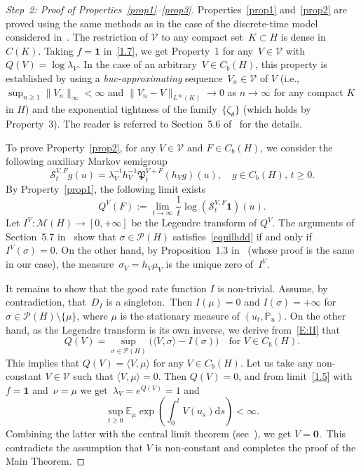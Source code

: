 \documentclass[AHL,Unicode,longabstracts]{cedram}
\newcommand{\mek}{{\mathbf 1}}
\newcommand{\IP}{{\mathbb P}}
\newcommand{\E}{{\mathbb E}}
\newcommand{\MM}{{\mathcal M}}
\newcommand{\PP}{{\mathcal P}}
\newcommand{\VV}{{\mathcal V}}
\newcommand{\la}{\lambda}
\newcommand{\ty}{\infty}
\newcommand{\PPPP}{{\mathfrak P}}
\newcommand{\SSS}{{\mathscr S}}
\newcommand{\lag}{\langle}
\newcommand{\rag}{\rangle}
\newcommand{\dd}{\mathrm{d}}
\begin{document}
\begin{proofc}
\begin{proof}[Step~2: Proof of Properties~\eqref{prop1}--\eqref{prop3}]
Properties~\eqref{prop1} and~\eqref{prop2} are proved using the same methods as in the case of the discrete-time model considered in~\cite{JNPS-2014}. The restriction of $\VV$ to any compact set~$K\subset H$ is dense in $C(K)$. Taking $f=\mek $ in~\eqref{1.7}, we get Property~1 for any~$V\in \VV$ with~$Q(V)=\log \la_V$. In the case of an arbitrary~$V\in C_b(H)$, this property is established by using a \emph{buc-approximating} sequence~$V_n\in\VV$ of $V$ (i.e.,~$\sup_{n\ge1}\|V_n\|_\ty \!< \!\ty$ and $\|V_n-V\|_{L^\ty(K)}\to 0$ as $ n\to\ty$ for any compact $K$ in $ H$) and the exponential tightness of the family~$\{\zeta_\theta\}$ (which holds by Property~3). The reader is referred to Section~5.6 of~\cite{JNPS-2014} for the details.

To prove Property~\eqref{prop2}, for any $V\in \VV$ and $F\in C_b(H)$, we consider the following auxiliary Markov semigroup
\[
\SSS_t^{V,F}g (u)=\lambda_V^{-t}h_V^{-1}\PPPP_t^{V+F}(h_V g)(u), \quad g\in C_b(H), \, t\ge0.
\]
By Property~\eqref{prop1}, the following limit exists
\[
Q^V(F):=\lim_{t\to\ty} \frac{1}{t}\log(\SSS_t^{V,F}{\mek})(u).
\]
Let $I^V: \MM(H)\to [0,+\infty] $ be the Legendre transform of $Q^V$.
The arguments of Section~5.7 in~\cite{JNPS-2014} show that $\sigma\in \PP(H)$ satisfies~\eqref{equilhdd} if and only if $I^V(\sigma)=0$. On the other hand, by Proposition~1.3 in~\cite{MN-2015} (whose proof is the same in our case), the measure~$\sigma_V=h_V\mu_V$ is the unique zero of~$I^V$.


It remains to show that the good rate function $I$ is non-trivial. Assume, by contradiction, that~$D_I$ is a singleton.~Then $I(\mu)=0$ and $I(\sigma)=+\ty$ for $\sigma\in\PP(H)\setminus\{\mu\}$, where $\mu$ is the stationary measure of $(u_t,\IP_u)$. On the other hand, as the Legendre transform is its own inverse, we derive from~\eqref{E:II} that
\[
Q(V)= \sup_{\sigma\in\PP(H)} \bigl(\lag V, \sigma\rag-I(\sigma)\bigr) \quad \text{for $V\in C_b(H)$}.
\]
This implies that $Q(V)=\lag V,\mu\rag$ for any $V\in C_b(H)$. Let us take any non-constant $V\in \VV$ such that $\lag V,\mu\rag=0$. Then $Q(V)=0$, and from limit~\eqref{1.5} with $f={\mathbf1}$ and~$\nu=\mu$ we get~$\la_V=e^{Q(V)}=1$ and
\begin{equation}\label{e52}
\sup_{t\ge0}\E_\mu \exp\left(\int_0^t V(u_s)\dd s\right)<\infty.
\end{equation}
Combining the latter with the central limit theorem (see~\cite[Proposition~4.1.4]{KS-book}), we get $V= {\mathbf0}$.~This contradicts the assumption that $V$ is non-constant and completes the proof of the Main Theorem.
\end{proof}
\let\qed\relax
\end{proofc}
\end{document}
